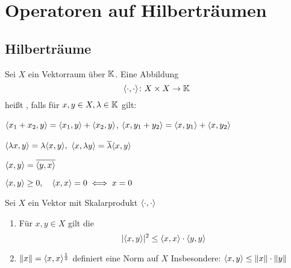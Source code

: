 

\chapter*{Operatoren auf Hilberträumen}  \setcounter{section}{14}



\section{Hilberträume}



\begin{definition} \label{def:15.1-Skalarprodukt}
	Sei $X$ ein Vektorraum über $\mathbb{K}$. Eine Abbildung
	\[ \langle \cdot, \cdot \rangle \colon X \times X \rightarrow \mathbb{K} \]
	hei{\ss}t , falls für $x, y \in X, \lambda \in \mathbb{K}$ gilt:
	\begin{description}
	 	\label{def:15.1i}
	 	\item[$\hspace{0.5cm} (S1) \hspace{0.1cm} $] $\langle x_{1} + x_{2}, y \rangle = \langle x_{1}, y \rangle + \langle x_{2}, y \rangle$, $\langle x, y_{1} + y_{2} \rangle = \langle x, y_{1} \rangle + \langle x, y_{2} \rangle$
 		\label{def:15.1ii}
	 	\item[$\hspace{0.5cm} (S2) \hspace{0.1cm} $] $\langle \lambda x, y \rangle = \lambda \langle x, y \rangle,$ $\langle x, \lambda y \rangle = \overline{\lambda} \langle x, y \rangle$
 		\label{def:15.1iii}
	 	\item[$\hspace{0.5cm} (S3) \hspace{0.1cm} $] $\langle x, y \rangle = \overline{\langle y, x \rangle }$
 		\label{def:15.1iv}
	 	\item[$\hspace{0.5cm} (S4) \hspace{0.1cm} $] $\langle x, y \rangle \geq 0, \quad \langle x, x \rangle = 0 \iff x = 0$
	\end{description}
\end{definition}


\begin{prop} \label{prop:15.2}
	Sei $X$ ein Vektor mit Skalarprodukt $\langle \cdot, \cdot \rangle$
	\begin{enumerate}[label=\alph*\upshape)] \label{prop:15.2a}
		\item Für $x, y \in X$ gilt die 
			\[ | \langle x, y \rangle |^{2} \leq \langle x, x \rangle \cdot \langle y, y \rangle \] \label{prop:15.2b}
		\item $\| x \| = \langle x, x \rangle^{\frac{1}{2}}$ definiert eine Norm auf $X$
			Insbesondere: $\langle x, y \rangle \leq \| x \| \cdot \| y \|$
	\end{enumerate}	
\end{prop}

